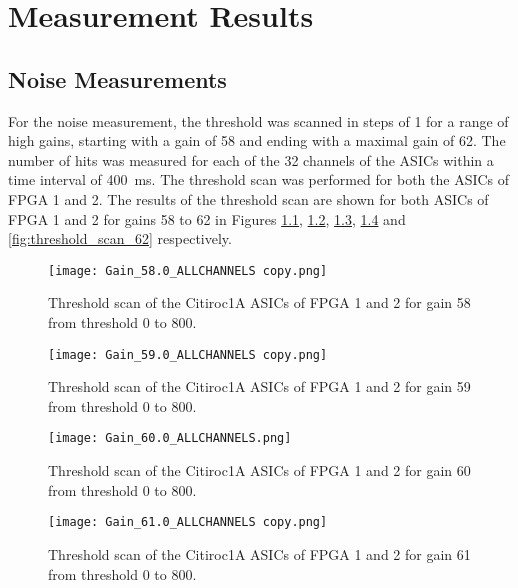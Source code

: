 \chapter{Measurement Results}\label{cha:results}
\noindent
\section{Noise Measurements}
For the noise measurement, the threshold was scanned in steps of 1 for a range of high gains,
starting with a gain of 58 and ending with a maximal gain of 62.
\newline
The number of hits was measured for each of the 32 channels of the ASICs within a time interval of \SI{400}{\milli\second}.
The threshold scan was performed for both the ASICs of FPGA 1 and 2.
\newline
The results of the threshold scan are shown for both ASICs of FPGA 1 and 2 for gains 58 to 62 in Figures \ref{fig:threshold_scan_58}, \ref{fig:threshold_scan_59}, \ref{fig:threshold_scan_60}, \ref{fig:threshold_scan_61} and \ref{fig:threshold_scan_62} respectively.

    \begin{figure}[H]
        \centering
        \texttt{[image: Gain\_58.0\_ALLCHANNELS copy.png]}
        \caption{Threshold scan of the Citiroc1A ASICs of FPGA 1 and 2 for gain 58 from threshold 0 to 800.}
        \label{fig:threshold_scan_58}
    \end{figure}
    
    \begin{figure}[H]
        \centering
        \texttt{[image: Gain\_59.0\_ALLCHANNELS copy.png]}
        \caption{Threshold scan of the Citiroc1A ASICs of FPGA 1 and 2 for gain 59 from threshold 0 to 800.}
        \label{fig:threshold_scan_59}
    \end{figure}
    
    \begin{figure}[H]
        \centering
        \texttt{[image: Gain\_60.0\_ALLCHANNELS.png]}
        \caption{Threshold scan of the Citiroc1A ASICs of FPGA 1 and 2 for gain 60 from threshold 0 to 800.}
        \label{fig:threshold_scan_60}
    \end{figure}
    
    \begin{figure}[H]
        \centering
        \texttt{[image: Gain\_61.0\_ALLCHANNELS copy.png]}
        \caption{Threshold scan of the Citiroc1A ASICs of FPGA 1 and 2 for gain 61 from threshold 0 to 800.}
        \label{fig:threshold_scan_61}
    \end{figure}
    
